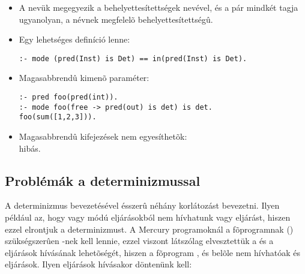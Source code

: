 \begin{itemize}
\item A nevük megegyezik a behelyettesítettségek nevével, és a pár mindkét
tagja ugyanolyan, a névnek megfelelõ behelyettesítettségû.
\item Egy lehetséges definíció lenne:
\begin{verbatim}
:- mode (pred(Inst) is Det) == in(pred(Inst) is Det).
\end{verbatim}
\end{itemize}

\begin{itemize}
\item Magasabbrendû kimenõ paraméter:
\begin{verbatim}
:- pred foo(pred(int)).
:- mode foo(free -> pred(out) is det) is det.
foo(sum([1,2,3])).
\end{verbatim}
\item Magasabbrendû kifejezések nem egyesíthetõk:\\
 hibás.
\end{itemize}

\subsection{Problémák a determinizmussal}

A determinizmus bevezetésével ésszerû néhány korlátozást bevezetni. Ilyen például az,
hogy  vagy  módú eljárásokból nem hívhatunk  vagy
 eljárást, hiszen ezzel elrontjuk a determinizmust. A Mercury programoknál a
fõprogramnak () szükségszerûen -nek kell lennie, ezzel viszont
látszólag elvesztettük a  és a  eljárások hívásának lehetõségét,
hiszen a fõprogram , és belõle nem hívhatóak  és  eljárások.
Ilyen eljárások hívásakor döntenünk kell:

